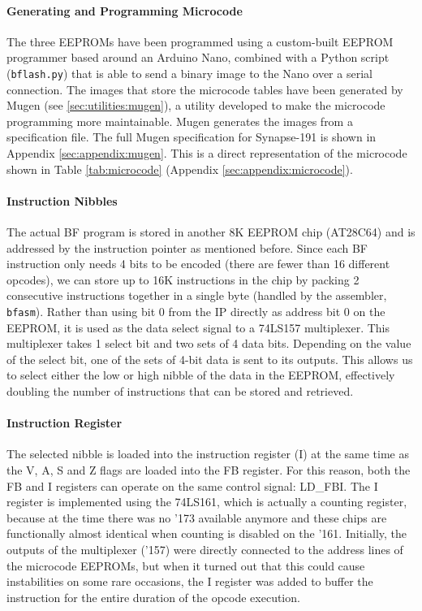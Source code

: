 \paragraph{Generating and Programming Microcode} The three EEPROMs have been programmed using a custom-built EEPROM programmer based around an Arduino Nano, combined with a Python script (\texttt{bflash.py}) that is able to send a binary image to the Nano over a serial connection. The images that store the microcode tables have been generated by Mugen (see \ref{sec:utilities:mugen}), a utility developed to make the microcode programming more maintainable. Mugen generates the images from a specification file. The full Mugen specification for Synapse-191 is shown in Appendix \ref{sec:appendix:mugen}. This is a direct representation of the microcode shown in Table \ref{tab:microcode} (Appendix \ref{sec:appendix:microcode}).



\paragraph{Instruction Nibbles} The actual BF program is stored in another 8K EEPROM chip (AT28C64) and is addressed by the instruction pointer as mentioned before. Since each BF instruction only needs 4 bits to be encoded (there are fewer than 16 different opcodes), we can store up to 16K instructions in the chip by packing 2 consecutive instructions together in a single byte (handled by the assembler, \texttt{bfasm}). Rather than using bit 0 from the IP directly as address bit 0 on the EEPROM, it is used as the data select signal to a 74LS157 multiplexer. This multiplexer takes 1 select bit and two sets of 4 data bits. Depending on the value of the select bit, one of the sets of 4-bit data is sent to its outputs. This allows us to select either the low or high nibble of the data in the EEPROM, effectively doubling the number of instructions that can be stored and retrieved.

\paragraph{Instruction Register} The selected nibble is loaded into the instruction register (I) at the same time as the V, A, S and Z flags are loaded into the FB register. For this reason, both the FB and I registers can operate on the same control signal: LD\_FBI. The I register is implemented using the 74LS161, which is actually a counting register, because at the time there was no '173 available anymore and these chips are functionally almost identical when counting is disabled on the '161. Initially, the outputs of the multiplexer ('157) were directly connected to the address lines of the microcode EEPROMs, but when it turned out that this could cause instabilities on some rare occasions, the I register was added to buffer the instruction for the entire duration of the opcode execution.
 
